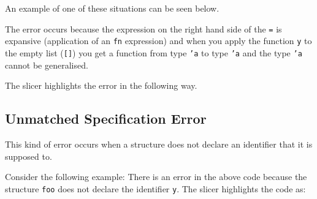 \documentclass{report}
\begin{document}
\begin{itemize}
An example of one of these situations can be seen below.


The error occurs because the expression on the right hand side of the
\texttt{=} is expansive (application of an \texttt{fn} expression) and when you apply the function
\texttt{y} to the empty list (\texttt{[]}) you get a function
from type \texttt{'a} to type \texttt{'a} and the type
\texttt{'a} cannot be generalised.

The slicer highlights the error in the following way.


\newpage


\subsection{Unmatched Specification Error}

\subitem This kind of error occurs when a structure does not declare
an identifier that it is supposed to.

Consider the following example:
There is an error in the above code because the structure
\texttt{foo} does not declare the identifier \texttt{y}.
The slicer highlights the code as:

\end{itemize}
\end{document}
